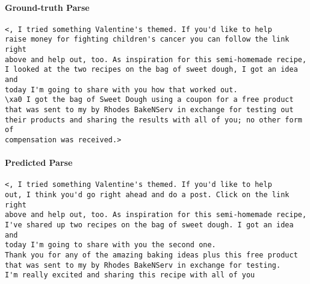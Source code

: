 \documentclass{article} \usepackage[accepted]{icml2023}
\begin{document}
\begin{figure*}
\small
\centering
{}
\begin{tcolorbox}
\paragraph{Ground-truth Parse}
\begin{verbatim}
<, I tried something Valentine's themed. If you'd like to help
raise money for fighting children's cancer you can follow the link right
above and help out, too. As inspiration for this semi-homemade recipe, 
I looked at the two recipes on the bag of sweet dough, I got an idea and 
today I'm going to share with you how that worked out.
\xa0 I got the bag of Sweet Dough using a coupon for a free product
that was sent to my by Rhodes BakeNServ in exchange for testing out
their products and sharing the results with all of you; no other form of 
compensation was received.>
\end{verbatim}
\end{tcolorbox}
\begin{tcolorbox}
\paragraph{Predicted Parse}
\begin{verbatim}
<, I tried something Valentine's themed. If you'd like to help
out, I think you'd go right ahead and do a post. Click on the link right
above and help out, too. As inspiration for this semi-homemade recipe, 
I've shared up two recipes on the bag of sweet dough. I got an idea and 
today I'm going to share with you the second one. 
Thank you for any of the amazing baking ideas plus this free product 
that was sent to my by Rhodes BakeNServ in exchange for testing. 
I'm really excited and sharing this recipe with all of you
\end{verbatim}
\end{tcolorbox}
\end{figure*}
\end{document}
